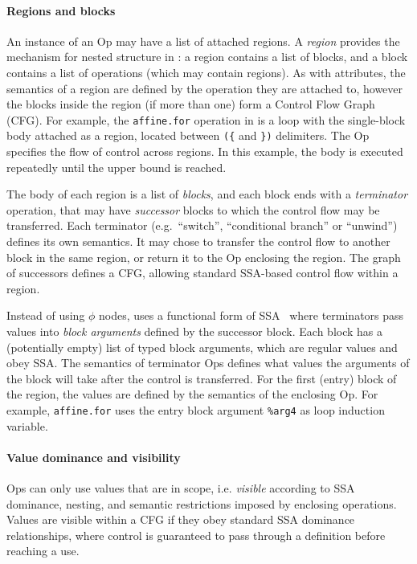 \paragraph{Regions and blocks}

An instance of an Op may have a list of attached regions.  A \emph{region}
provides the mechanism for nested structure in \MLIR: a region contains a list
of blocks, and a block contains a list of operations (which may contain regions).
As with attributes, the semantics of a region are defined by the operation they
are attached to, however the blocks inside the region (if more than one) form a
Control Flow Graph (CFG).  For example, the \lstinline|affine.for| operation in
 is a loop with the single-block body attached as a region,
located between \lstinline|({| and \lstinline|})| delimiters.  The Op
specifies the flow of control across regions. In this example, the body is
executed repeatedly until the upper bound is reached.

The body of each region is a list of \emph{blocks}, and each block ends with a
\emph{terminator} operation, that may have \emph{successor} blocks to which the
control flow may be transferred. Each terminator
(e.g.\ ``switch'', ``conditional branch'' or ``unwind'') defines its
own semantics. It may chose to transfer the control flow to another block in
the same region, or return it to the Op enclosing the region. The graph of
successors defines a CFG, allowing standard SSA-based
control flow within a region.

Instead of using $\phi$ nodes, \MLIR uses a functional form of SSA~\cite{Appel98ssais}
where terminators pass values into \emph{block arguments} defined by the successor block.
Each block has a (potentially empty) list of typed block arguments, which are
regular values and obey SSA. The semantics of terminator Ops defines what
values the arguments of the block will take after the control is transferred.
For the first (entry) block of the region, the values are defined by the
semantics of the enclosing Op. For example, \lstinline|affine.for| uses the
entry block argument \lstinline|%arg4| as loop induction variable.

\paragraph{Value dominance and visibility}

Ops can only use values that are in scope, i.e. \emph{visible} according to
SSA dominance, nesting, and semantic restrictions imposed by enclosing
operations.  Values are visible within a CFG if they obey standard SSA
dominance relationships, where control is guaranteed to pass through a
definition before reaching a use.


